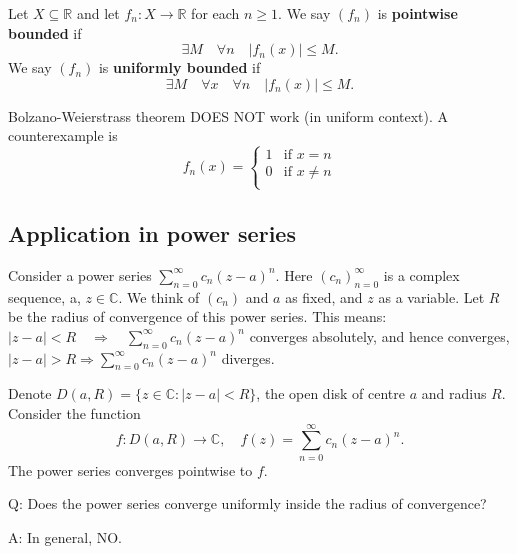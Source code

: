 \documentclass[a4paper,11pt]{article}
\begin{document}
\begin{definition}
    Let $X \subseteq \mathbb{R}$ and let $f_n:X\to \mathbb{R}$ for each $n\ge 1$. We say $(f_n)$ is \textbf{pointwise bounded} if 
    \[
        \exists M\quad \forall n\quad |f_n(x)|\le M. 
    \]
    We say $(f_n)$ is \textbf{uniformly bounded} if 
    \[
        \exists M \quad \forall x\quad \forall n \quad |f_n(x)|\le M. 
    \]
\end{definition}

\begin{note}
    Bolzano-Weierstrass theorem DOES NOT work (in uniform context). A counterexample is 
    \[
        f_n(x) = \begin{cases}
        1 &\text{if }x = n\\
        0 &\text{if }x\neq n\\
        \end{cases} 
    \]
\end{note}

\subsection{Application in power series}

Consider a power series $\sum_{n=0}^{\infty} c_{n}(z-a)^{n}$. Here $\left(c_{n}\right)_{n=0}^{\infty}$ is a complex sequence, a, $z \in \mathbb{C}$. We think of $\left(c_{n}\right)$ and $a$ as fixed, and $z$ as a variable.
Let $R$ be the radius of convergence of this power series. This means:
$|z-a|<R \quad \Longrightarrow \quad \sum_{n=0}^{\infty} c_{n}(z-a)^{n}$ converges absolutely, and hence converges, $|z-a|>R \Longrightarrow \sum_{n=0}^{\infty} c_{n}(z-a)^{n}$ diverges.

Denote $D(a, R)=\{z \in \mathbb{C}:|z-a|<R\}$, the open disk of centre $a$ and radius $R$. Consider the function
\[
f: D(a, R)  \rightarrow \mathbb{C},\quad
f(z) =\sum_{n=0}^{\infty} c_{n}(z-a)^{n}.
\]
The power series converges pointwise to $f$.

Q: Does the power series converge uniformly inside the radius of convergence?

A: In general, NO.
\end{document}
